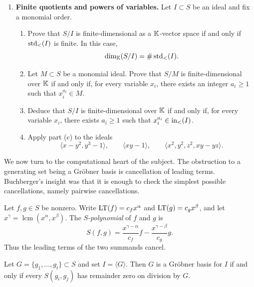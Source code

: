 \documentclass[12pt,reqno]{amsart}
\begin{document}
\begin{enumerate}[leftmargin=*, resume=problems]
\begin{enumerate}[label=(\alph*),ref=\theenumi\alph*]
    \item With $I$ as in part (d), compute the normal forms of $x^5$, $x^2y+y^7$, and $xy^2+x+y$.
\end{enumerate}

\item \textbf{Finite quotients and powers of variables.} Let $I\subset S$ be an ideal and fix a monomial order.
\begin{enumerate}[label=(\alph*),ref=\theenumi\alph*]
    \item Prove that $S/I$ is finite-dimensional as a $\mathbb{K}$-vector space if and only if $\operatorname{std}_<(I)$ is finite. In this case,
    \[
    \dim_{\mathbb{K}}(S/I)=\#\operatorname{std}_<(I).
    \]
    
    \item Let $M\subset S$ be a monomial ideal. Prove that $S/M$ is finite-dimensional over $\mathbb{K}$ if and only if, for every variable $x_i$, there exists an integer $a_i\geq1$ such that $x_i^{a_i}\in M$.
    
    \item Deduce that $S/I$ is finite-dimensional over $\mathbb{K}$ if and only if, for every variable $x_i$, there exists $a_i\geq1$ such that $x_i^{a_i}\in \operatorname{in}_<(I)$.
    
    \item Apply part (c) to the ideals
    \[
    \langle x-y^2,y^3-1\rangle,\qquad \langle xy-1\rangle,\qquad \langle x^2,y^2,z^2,xy-yz\rangle.
    \]
\end{enumerate}
\end{enumerate}

\hrulefill

We now turn to the computational heart of the subject. The obstruction to a generating set being a Gr\"obner basis is cancellation of leading terms. Buchberger's insight was that it is enough to check the simplest possible cancellations, namely pairwise cancellations.

\begin{definition}
Let $f,g\in S$ be nonzero. Write $\operatorname{LT}(f)=c_fx^{\alpha}$ and $\operatorname{LT}(g)=c_gx^{\beta}$, and let $x^{\gamma}=\operatorname{lcm}(x^{\alpha},x^{\beta})$. The \emph{$S$-polynomial} of $f$ and $g$ is
\[
    S(f,g)=\frac{x^{\gamma-\alpha}}{c_f}f-\frac{x^{\gamma-\beta}}{c_g}g.
\]
Thus the leading terms of the two summands cancel.
\end{definition}

\begin{theorem}\label{thm:buchberger}
Let $G=\{g_1,\ldots,g_t\}\subset S$ and set $I=\langle G\rangle$. Then $G$ is a Gr\"obner basis for $I$ if and only if every $S(g_i,g_j)$ has remainder zero on division by $G$.
\end{theorem}
\end{document}

